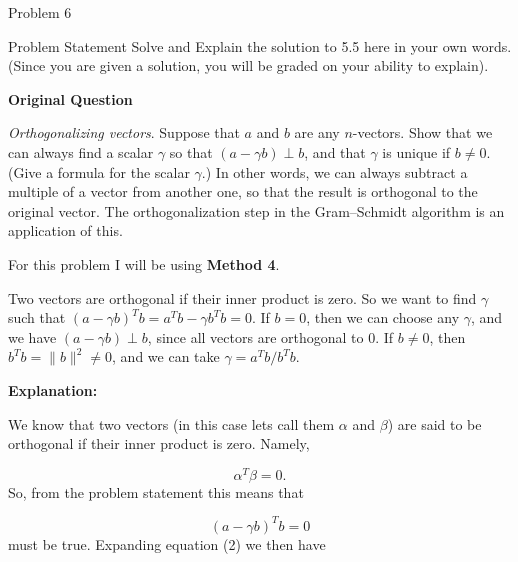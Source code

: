 \begin{problem}{Problem 6}
    \begin{statement}{Problem Statement}
        Solve and Explain the solution to 5.5 here in your own words. (Since you are given a solution, you will be graded on your ability to explain). \vspace*{1em}

        \textbf{Original Question} \vspace*{1em}

        \textit{Orthogonalizing vectors}. Suppose that $a$ and $b$ are any $n$-vectors. Show that we can always find a scalar $\gamma$ so that $(a - \gamma b) \perp b$, and that $\gamma$ is unique if 
        $b \neq 0$. (Give a formula for the scalar $\gamma$.) In other words, we can always subtract a multiple of a vector from another one, so that the result is orthogonal to the original vector. 
        The orthogonalization step in the Gram–Schmidt algorithm is an application of this.
    \end{statement}

    \begin{highlight}[Solution]
        For this problem I will be using \textbf{Method 4}. \vspace*{1em}

        Two vectors are orthogonal if their inner product is zero. So we want to find $\gamma$ such that $(a - \gamma b)^{T}b = a^{T}b - \gamma b^{T}b = 0$. If $b = 0$, then we can choose any $\gamma$, 
        and we have $(a - \gamma b) \perp b$, since all vectors are orthogonal to 0. If $b \neq 0$, then $b^{T}b = \| b \|^{2} \neq 0$, and we can take $\gamma = a^{T}b / b^{T}b$. \vspace*{1em}

        \textbf{Explanation:} \vspace*{1em}

        We know that two vectors (in this case lets call them $\alpha$ and $\beta$) are said to be orthogonal if their inner product is zero. Namely,

        \setcounter{equation}{0}
        \begin{equation}
            \alpha^{T}\beta = 0.
        \end{equation}
        So, from the problem statement this means that

        \begin{equation}
            (a - \gamma b)^{T}b = 0
        \end{equation}
        must be true. Expanding equation (2) we then have


\end{highlight}
\end{problem}
